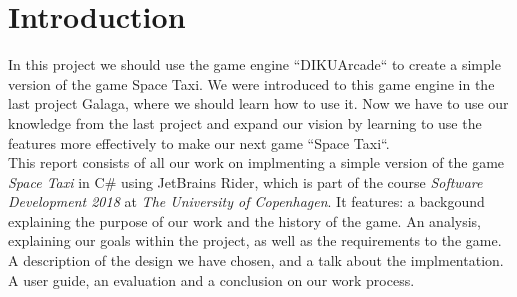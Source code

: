 \documentclass[../master.tex]{subfile}
\begin{document}
\section{Introduction}
In this project we should use the game engine ``DIKUArcade`` to create a simple version of the game Space Taxi. We were introduced to this game engine in the last project Galaga, where we should learn how to use it. Now we have to use our knowledge from the last project and expand our vision by learning to use the features more effectively to make our next game ``Space Taxi``.\\

This report consists of all our work on implmenting a simple version of the game \textit{Space Taxi} in C\# using JetBrains Rider, which is part of the course \textit{Software Development 2018} at \textit{The University of Copenhagen}. It features: a backgound explaining the purpose of our work and the history of the game. An analysis, explaining our goals within the project, as well as the requirements to the game. A description of the design we have chosen, and a talk about the implmentation. A user guide, an evaluation and a conclusion on our work process.
\end{document}
